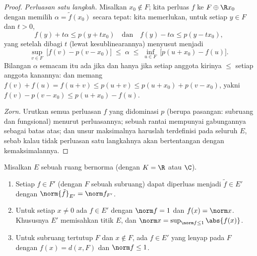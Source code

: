 \begin{proof}
\emph{Perluasan satu langkah.} Misalkan $x_0 \notin F$; kita perluas $f$ ke
$F \oplus \R x_0$ dengan memilih $\alpha = \tilde f(x_0)$
secara tepat: kita memerlukan, untuk setiap $y \in F$ dan $t > 0$,
\[
f(y) + t\alpha \leq p(y + tx_0)
\quad\text{dan}\quad
f(y) - t\alpha \leq p(y - tx_0),
\]
yang setelah dibagi $t$ (lewat kesublinearannya) menyusut menjadi
\[
\sup_{v \in F}\ \bigl[f(v) - p(v - x_0)\bigr]
\;\leq\; \alpha \;\leq\;
\inf_{u \in F}\ \bigl[p(u + x_0) - f(u)\bigr].
\]
Bilangan $\alpha$ semacam itu ada jika dan hanya jika setiap anggota kirinya $\leq$ setiap
anggota kanannya: dan memang $f(v) + f(u) = f(u + v) \leq p(u + v) \leq
p(u + x_0) + p(v - x_0)$, yakni $f(v) - p(v - x_0) \leq p(u +
x_0) - f(u)$.

\emph{Zorn.} Urutkan semua perluasan $f$ yang didominasi $p$
(berupa pasangan: subruang dan fungsional) menurut perluasannya; sebuah rantai
mempunyai gabungannya sebagai batas atas; dan unsur maksimalnya haruslah terdefinisi pada seluruh
$E$, sebab kalau tidak perluasan satu langkahnya akan bertentangan dengan kemaksimalannya.
\end{proof}

\begin{corollary}\label{cor:b3:banach:hbnormed}
Misalkan $E$ sebuah ruang bernorma (dengan $K = \R$ atau $\C$).
\begin{enumerate}
  \item Setiap $f \in F'$ (dengan $F$ sebuah subruang) dapat diperluas menjadi $\tilde f
        \in E'$ dengan $\norm{\tilde f}_{E'} = \norm f_{F'}$.
  \item Untuk setiap $x \neq 0$ ada $f \in E'$ dengan $\norm f
        = 1$ dan $f(x) = \norm x$. Khususnya $E'$ memisahkan
        titik $E$, dan $\norm x = \sup_{\norm f \leq
        1}\abs{f(x)}$.
  \item Untuk subruang tertutup $F$ dan $x \notin F$, ada $f
        \in E'$ yang lenyap pada $F$ dengan $f(x) = d(x, F)$ dan
        $\norm f \leq 1$.
\end{enumerate}
\end{corollary}

